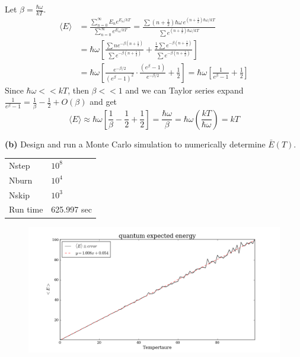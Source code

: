 \documentclass{article}
\begin{document}
Let $\beta = \frac{\hbar\omega}{kT}$.
\begin{align*}
	\langle E \rangle 
	&= \frac{\sum\limits_{n=0}^{\infty} E_n e^{E_n/kT}}{\sum\limits_{n=0}^{\infty} e^{E_n/kT}}
	= \frac{\sum (n+\frac{1}{2})\hbar\omega \, e^{(n+\frac{1}{2})\hbar\omega/kT}}{\sum e^{(n+\frac{1}{2})\hbar\omega/kT}} \\
	&= \hbar\omega \left[\frac{\sum n e^{-\beta (n+\frac{1}{2})}}{\sum e^{-\beta (n+\frac{1}{2})}} + \frac{ \frac{1}{2} \sum e^{-\beta (n+\frac{1}{2})} }{\sum e^{-\beta (n+\frac{1}{2})}} \right] \\
	&= \hbar\omega \left[\frac{e^{-\beta/2}}{(e^{\beta} - 1)^2} \cdot \frac{(e^{\beta} - 1)}{e^{-\beta/2}} + \frac{1}{2} \right] 
	= \hbar\omega \left[\frac{1}{e^{\beta} - 1} + \frac{1}{2} \right]
\end{align*}
Since $\hbar\omega << kT$, then $\beta << 1$ and we can Taylor series expand $\frac{1}{e^{\beta} - 1} = \frac{1}{\beta} - \frac{1}{2} + O(\beta)$ and get
\begin{equation*}
	\langle E \rangle 
	\approx \hbar\omega \left[\frac{1}{\beta} - \frac{1}{2} + \frac{1}{2} \right]
	= \frac{\hbar\omega}{\beta} = \hbar\omega \left(\frac{kT}{\hbar\omega} \right) = kT
\end{equation*}

\textbf{(b)} Design and run a Monte Carlo simulation to numerically determine $\bar{E}(T)$. \\

\begin{table}[H]
\centering
\begin{tabular}{|l|l|}
	\hline
	Nstep    & $10^8$ \\
	Nburn    & $10^4$ \\
	Nskip    & $10^3$ \\
	Run time & 625.997 sec \\
	\hline
\end{tabular}
\end{table}

\begin{figure}[H]
\begin{center}
\includegraphics[width=16cm]{../output/quantum/expected.png} 
\end{center}
\end{figure}
\end{document}
